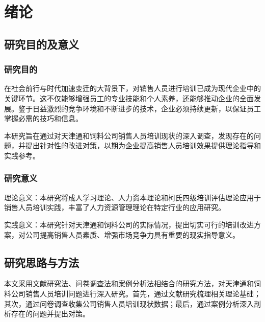 \section{绪论}

\subsection{研究目的及意义}

\subsubsection{研究目的}

在社会前行与时代加速变迁的大背景下，对销售人员进行培训已成为现代企业中的关键环节。这不仅能够增强员工的专业技能和个人素养，还能够推动企业的全面发展。鉴于日益激烈的竞争环境和不断进步的技术，企业必须持续更新，以保证员工掌握必需的技巧和信息。

本研究旨在通过对天津通和饲料公司销售人员培训现状的深入调查，发现存在的问题，并提出针对性的改进对策，以期为企业提高销售人员培训效果提供理论指导和实践参考。

\subsubsection{研究意义}

理论意义：本研究将成人学习理论、人力资本理论和柯氏四级培训评估理论应用于销售人员培训实践，丰富了人力资源管理理论在特定行业的应用研究。

实践意义：本研究针对天津通和饲料公司的实际情况，提出切实可行的培训改进方案，对公司提高销售人员素质、增强市场竞争力具有重要的现实指导意义。

\subsection{研究思路与方法}

本文采用文献研究法、问卷调查法和案例分析法相结合的研究方法，对天津通和饲料公司销售人员培训问题进行深入研究。首先，通过文献研究梳理相关理论基础；其次，通过问卷调查收集公司销售人员培训现状数据；最后，通过案例分析深入剖析存在的问题并提出对策。
